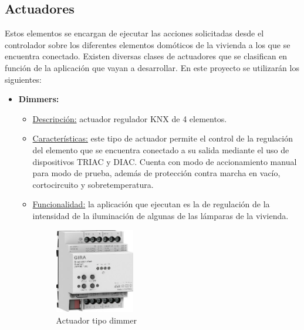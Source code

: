 \subsection{Actuadores} Estos elementos se encargan de ejecutar las acciones solicitadas desde el controlador sobre los diferentes elementos domóticos de la vivienda a los que se encuentra conectado. Existen diversas clases de actuadores que se clasifican en función de la aplicación que vayan a desarrollar. En este proyecto se utilizarán los siguientes:

\begin{itemize}
\item \textbf{Dimmers:} 
	\begin{itemize}
	\item\underline{Descripción:} actuador regulador KNX de 4 elementos.
	\item \underline{Características:} este tipo de actuador permite el control de la regulación del elemento que se encuentra conectado a su salida mediante el uso de dispositivos TRIAC y DIAC. Cuenta con modo de accionamiento manual para modo de prueba, además de protección contra marcha en vacío, cortocircuito y sobretemperatura. 
	\item \underline{Funcionalidad:} la aplicación que ejecutan es la de regulación de la intensidad de la iluminación de algunas de las lámparas de la vivienda.\\ [0,15 cm]
		\begin{figure}[H]
		\centering
		\includegraphics[width=0.35\textwidth]{figures/actuador_dimmer.jpg}   
		\caption{Actuador tipo dimmer}
		\label{fig:actuador_dimmer}
		\end{figure}
	\end{itemize} 


\end{itemize}
